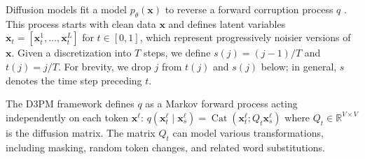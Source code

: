 \documentclass{article} %
\begin{document}


Diffusion models fit a model $p_\theta(\mathbf{x})$ to reverse a forward corruption process $q$ \citep{sohl2015deep,ho2020denoising,sahoo2024diffusion}. This process starts with clean data $\mathbf{x}$ and defines latent variables $\mathbf{x}_t = \left[\mathbf{x}^1_t, \dots, \mathbf{x}^L_t\right]$ for $t \in [0, 1]$, which represent progressively noisier versions of $\mathbf{x}$. Given a discretization into $T$ steps, we define $s(j) = (j -1)/T$ and $t(j) = j /T$. For brevity, we drop $j$ from $t(j)$ and $s(j)$ below; in general, $s$ denotes the time step preceding $t$.

The D3PM framework \citep{austin2021structured} defines $q$ as a Markov forward process acting independently on each token $\mathbf{x}^\ell$:
$q(\mathbf{x}^\ell_{t} \mid \mathbf{x}^\ell_{s}) = \operatorname{Cat}(\mathbf{x}^\ell_t ; Q_t \mathbf{x}^\ell_{s})$
where $Q_t \in \mathbb{R}^{V \times V}$ is the diffusion matrix. The matrix $Q_t$ can model various transformations, including masking, random token changes, and related word substitutions. 
\end{document}
